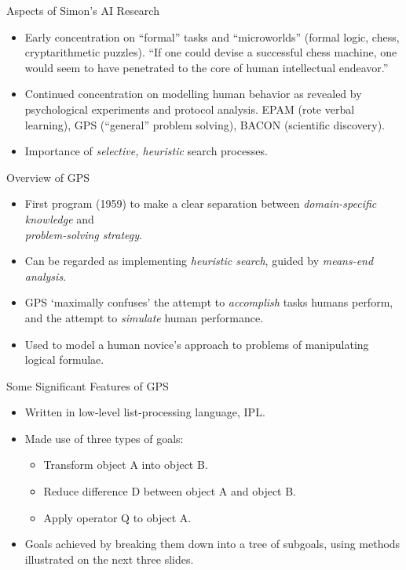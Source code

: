 \documentclass{article}
\begin{document}
\begin{slide}{}
{\Large Aspects of Simon's AI Research}
\begin{itemize}
\item Early concentration on ``formal'' tasks and ``microworlds''
(formal logic, chess, cryptarithmetic puzzles).
``If one could devise a successful chess machine, one would seem to
have penetrated to the core of human intellectual endeavor.''
\item Continued concentration on modelling human behavior as revealed
by psychological experiments and protocol analysis. EPAM (rote verbal
learning), GPS (``general'' problem solving), BACON (scientific
discovery).
\item Importance of {\em selective, heuristic} search processes.
\end{itemize}
\end{slide}

\begin{slide}{}
{\Large Overview of GPS}
\begin{itemize}
\item First program (1959) to make a clear separation between {\em
domain-specific knowledge} and\\{\em problem-solving strategy}.
\item Can be regarded as implementing {\em heuristic search}, guided
by {\em means-end analysis}.
\item GPS `maximally confuses' the attempt to {\em accomplish} tasks humans
perform, and the attempt to {\em simulate} human performance.
\item Used to model a human novice's approach to problems of
manipulating logical formulae.
\end{itemize}
\end{slide}

\begin{slide}{}
{\Large Some Significant Features of GPS}
\begin{itemize}
\item Written in low-level list-processing language, IPL.
\item Made use of three types of goals:
\begin{itemize}
\item Transform object A into object B.
\item Reduce difference D between object A and object B.
\item Apply operator Q to object A.
\end{itemize}
\item Goals achieved by breaking them down into a tree of
subgoals, using methods illustrated on the next three slides.
\end{itemize}
\end{slide}
\end{document}
